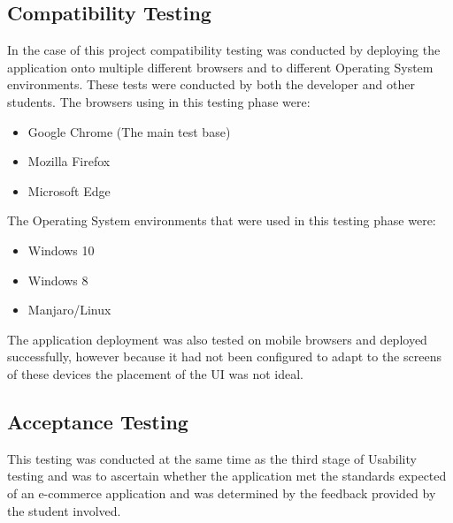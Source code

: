 \subsection{Compatibility Testing}
In the case of this project compatibility testing was conducted by deploying the application onto multiple different browsers and to different Operating System environments. These tests were conducted by both the developer and other students. The browsers using in this testing phase were:

\begin{itemize}
    \item Google Chrome (The main test base)
    \item Mozilla Firefox
    \item Microsoft Edge
\end{itemize}

The Operating System environments that were used in this testing phase were:

\begin{itemize}
    \item Windows 10
    \item Windows 8
    \item Manjaro/Linux
\end{itemize}

The application deployment was also tested on mobile browsers and deployed successfully, however because it had not been configured to adapt to the screens of these devices the placement of the UI was not ideal.

\subsection{Acceptance Testing}
This testing was conducted at the same time as the third stage of Usability testing and was to ascertain whether the application met the standards expected of an e-commerce application and was determined by the feedback provided by the student involved.

\newpage

